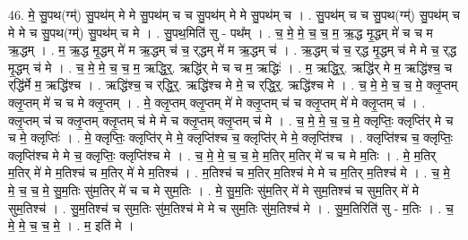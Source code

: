 \documentclass[17pt]{extarticle}
\begin{document}
46. मे॒ सु॒पथ(ग्म्॑) सु॒पथ॑म् मे मे सु॒पथ॑म् च च सु॒पथ॑म् मे मे सु॒पथ॑म् च । . सु॒पथ॑म् च च सु॒पथ(ग्म्॑) सु॒पथ॑म् च मे मे च सु॒पथ(ग्म्॑) सु॒पथ॑म् च मे । . सु॒पथ॒मिति॑ सु - पथ᳚म् । . च॒ मे॒ मे॒ च॒ च॒ म॒ ऋ॒द्ध मृ॒द्धम् मे॑ च च म ऋ॒द्धम् । . म॒ ऋ॒द्ध मृ॒द्धम् मे॑ म ऋ॒द्धम् च॑ च॒ र्‌द्धम् मे॑ म ऋ॒द्धम् च॑ । . ऋ॒द्धम् च॑ च॒ र्‌द्ध मृ॒द्धम् च॑ मे मे च॒ र्‌द्ध मृ॒द्धम् च॑ मे । . च॒ मे॒ मे॒ च॒ च॒ म॒ ऋद्धि॒र्॒. ऋद्धि॑र् मे च च म॒ ऋद्धिः॑ । . म॒ ऋद्धि॒र्॒. ऋद्धि॑र् मे म॒ ऋद्धि॑श्च॒ च र्‌द्धि॑र्मे म॒ ऋद्धि॑श्च । . ऋद्धि॑श्च॒ च र्‌द्धि॒र्॒. ऋद्धि॑श्च मे मे॒ च र्‌द्धि॒र्॒. ऋद्धि॑श्च मे । . च॒ मे॒ मे॒ च॒ च॒ मे॒ क्लृ॒प्तम् क्लृ॒प्तम् मे॑ च च मे क्लृ॒प्तम् । . मे॒ क्लृ॒प्तम् क्लृ॒प्तम् मे॑ मे क्लृ॒प्तम् च॑ च क्लृ॒प्तम् मे॑ मे क्लृ॒प्तम् च॑ । . क्लृ॒प्तम् च॑ च क्लृ॒प्तम् क्लृ॒प्तम् च॑ मे मे च क्लृ॒प्तम् क्लृ॒प्तम् च॑ मे । . च॒ मे॒ मे॒ च॒ च॒ मे॒ क्लृप्तिः॒ क्लृप्ति॑र् मे च च मे॒ क्लृप्तिः॑ । . मे॒ क्लृप्तिः॒ क्लृप्ति॑र् मे मे॒ क्लृप्ति॑श्च च॒ क्लृप्ति॑र् मे मे॒ क्लृप्ति॑श्च । . क्लृप्ति॑श्च च॒ क्लृप्तिः॒ क्लृप्ति॑श्च मे मे च॒ क्लृप्तिः॒ क्लृप्ति॑श्च मे । . च॒ मे॒ मे॒ च॒ च॒ मे॒ म॒तिर् म॒तिर् मे॑ च च मे म॒तिः । . मे॒ म॒तिर् म॒तिर् मे॑ मे म॒तिश्च॑ च म॒तिर् मे॑ मे म॒तिश्च॑ । . म॒तिश्च॑ च म॒तिर् म॒तिश्च॑ मे मे च म॒तिर् म॒तिश्च॑ मे । . च॒ मे॒ मे॒ च॒ च॒ मे॒ सु॒म॒तिः सु॑म॒तिर् मे॑ च च मे सुम॒तिः । . मे॒ सु॒म॒तिः सु॑म॒तिर् मे॑ मे सुम॒तिश्च॑ च सुम॒तिर् मे॑ मे सुम॒तिश्च॑ । . सु॒म॒तिश्च॑ च सुम॒तिः सु॑म॒तिश्च॑ मे मे च सुम॒तिः सु॑म॒तिश्च॑ मे । . सु॒म॒तिरिति॑ सु - म॒तिः । . च॒ मे॒ मे॒ च॒ च॒ मे॒ । . म॒ इति॑ मे । \newline
\pagebreak
{}
\end{document}
